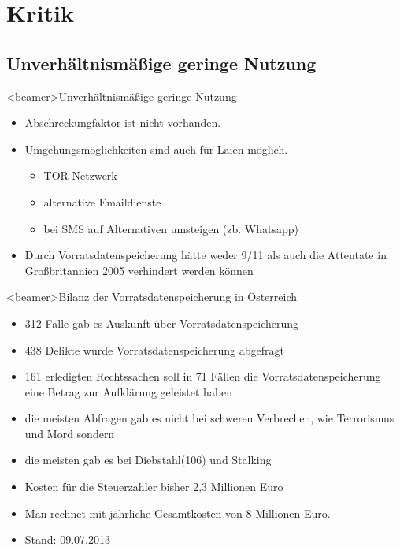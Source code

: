 \section{Kritik}
  \subsection*{Unverhältnismäßige geringe Nutzung}
    \begin{frame}<beamer>{Unverhältnismäßige geringe Nutzung}
      \begin{itemize}
        \item
          Abschreckungfaktor ist nicht vorhanden.
        \item
         Umgehungsmöglichkeiten sind auch für Laien möglich.
        \begin{itemize}
          \item TOR-Netzwerk
          \item alternative Emaildienste
          \item bei SMS auf Alternativen umsteigen (zb. Whatsapp)
        \end{itemize}
        \item Durch Vorratsdatenspeicherung hätte weder 9/11 als auch die Attentate in Großbritannien 2005 verhindert werden können
      \end{itemize}
    \end{frame}

    \begin{frame}<beamer>{Bilanz der Vorratsdatenspeicherung in Österreich}
        \begin{itemize}
        \item 312 Fälle gab es Auskunft über Vorratsdatenspeicherung
        \item 438 Delikte wurde Vorratsdatenspeicherung abgefragt
        \item 161 erledigten Rechtssachen soll in 71 Fällen die Vorratsdatenspeicherung eine Betrag zur Aufklärung geleistet haben
        \item die meisten Abfragen gab es nicht bei schweren Verbrechen, wie Terrorismus und Mord sondern
        \item die meisten gab es bei Diebstahl(106) und Stalking
        \item Kosten für die Steuerzahler bisher 2,3 Millionen Euro
        \item Man rechnet mit jährliche Gesamtkosten von 8 Millionen Euro.
        \item Stand: 09.07.2013 
         \end{itemize}
    \end{frame}

